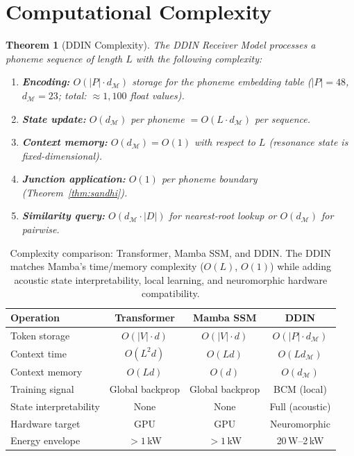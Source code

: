 \documentclass{article}
\newtheorem{theorem}{Theorem}
\begin{document}
\section{Computational Complexity}

\begin{theorem}[DDIN Complexity]
The DDIN Receiver Model processes a phoneme sequence of length $L$ with the following complexity:
\begin{enumerate}[label=(\roman*)]
  \item \textbf{Encoding:} $O(|P| \cdot d_\mathcal{M})$ storage for the phoneme embedding table ($|P| = 48$, $d_\mathcal{M} = 23$; total: $\approx 1{,}100$ float values).
  \item \textbf{State update:} $O(d_\mathcal{M})$ per phoneme $= O(L \cdot d_\mathcal{M})$ per sequence.
  \item \textbf{Context memory:} $O(d_\mathcal{M}) = O(1)$ with respect to $L$ (resonance state is fixed-dimensional).
  \item \textbf{Junction application:} $O(1)$ per phoneme boundary (Theorem~\ref{thm:sandhi}).
  \item \textbf{Similarity query:} $O(d_\mathcal{M} \cdot |D|)$ for nearest-root lookup or $O(d_\mathcal{M})$ for pairwise.
\end{enumerate}
\end{theorem}

\begin{table}[htbp]
\centering
\renewcommand{\arraystretch}{1.3}
\begin{tabular}{lccc}
\toprule
\textbf{Operation} & \textbf{Transformer} & \textbf{Mamba SSM} & \textbf{DDIN}\\
\midrule
Token storage & $O(|V| \cdot d)$ & $O(|V| \cdot d)$ & $O(|P| \cdot d_\mathcal{M})$\\
Context time & $O(L^2 d)$ & $O(L d)$ & $O(L d_\mathcal{M})$\\
Context memory & $O(L d)$ & $O(d)$ & $O(d_\mathcal{M})$\\
Training signal & Global backprop & Global backprop & BCM (local)\\
State interpretability & None & None & Full (acoustic)\\
Hardware target & GPU & GPU & Neuromorphic\\
Energy envelope & $>1$\,kW & $>1$\,kW & 20\,W--2\,kW\\
\bottomrule
\end{tabular}
\caption{Complexity comparison: Transformer, Mamba SSM, and DDIN. The DDIN matches Mamba's time/memory complexity ($O(L)$, $O(1)$) while adding acoustic state interpretability, local learning, and neuromorphic hardware compatibility.}
\label{tab:complexity}
\end{table}
\end{document}
